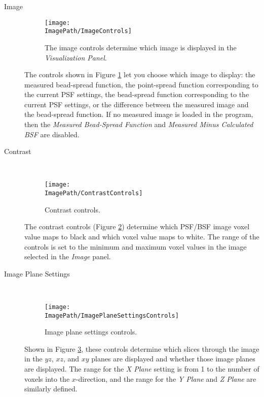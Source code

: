 \documentclass[11pt,titlepage,twoside]{article}
\begin{document}
\begin{description}

  \item[Image] \hfill
   \begin{figure}[h]
    \centering
    \texttt{[image: \\ImagePath/ImageControls]}
    \caption{The image controls determine which image is displayed in the \emph{Visualization Panel}.}
    \label{fig:ImageControls}
  \end{figure}
 
The controls shown in Figure \ref{fig:ImageControls} let you choose which image to display: the measured bead-spread function, the point-spread function corresponding to the current PSF settings, the bead-spread function corresponding to the current PSF settings, or the difference between the measured image and the bead-spread function. If no measured image is loaded in the program, then the \emph{Measured Bead-Spread Function} and \emph{Measured Minus Calculated BSF} are disabled.

  \item[Contrast] \hfill \\
  
    \begin{figure}[h]
    \centering
    \texttt{[image: \\ImagePath/ContrastControls]}
    \caption{Contrast controls.}
    \label{fig:ContrastControls}
  \end{figure}
  
  The contrast controls (Figure \ref{fig:ContrastControls}) determine which PSF/BSF image voxel value maps to black and which voxel value maps to white. The range of the controls is set to the minimum and maximum voxel values in the image selected in the \emph{Image} panel.

  \item[Image Plane Settings] \hfill \\
  
    \begin{figure}[h]
    \centering
    \texttt{[image: \\ImagePath/ImagePlaneSettingsControls]}
    \caption{Image plane settings controls.}
    \label{fig:ImagePlaneSettingsControls}
  \end{figure}
  
  Shown in Figure \ref{fig:ImagePlaneSettingsControls}, these controls determine which slices through the image in the $yz$, $xz$, and $xy$ planes are displayed and whether those image planes are displayed. The range for the \emph{X Plane} setting is from 1 to the number of voxels into the $x$-direction, and the range for the \emph{Y Plane} and \emph{Z Plane} are similarly defined.


\end{description}
\end{document}
